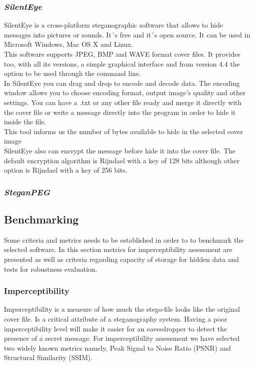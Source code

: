 \documentclass[11pt]{article}
\begin{document}
\subsubsection{\textit{SilentEye}}
SilentEye is a cross-platform steganographic software that allows to hide messages into pictures or sounds. It´s free and it´s open source. It can be used in Microsoft Windows, Mac OS X and Linux. \\
This software supports JPEG, BMP and WAVE format cover files. It provides too, with all its versions, a simple graphical interface and from version 4.4 the option to be used through the command line. \\
In SilentEye you can drag and drop to encode and decode data. The encoding window allows you to choose encoding format, output image’s quality and other settings. You can have a .txt or any other file ready and merge it directly with the cover file or write a message directly into the program in order to hide it inside the file.\\
This tool informs us the number of bytes available to hide in the selected cover image \\
SilentEye also can encrypt the message before hide it into the cover file. The default encryption algorithm is Rijndael with a key of 128 bits although other option is Rijndael with a key of 256 bits.

\subsubsection{\textit{SteganPEG}}

\subsection{Benchmarking}

Some criteria and metrics needs to be established in order to to benchmark the selected software.
In this section metrics for imperceptibility assessment are presented as well as criteria regarding capacity of storage for
hidden data and tests for robustness evaluation.

\subsubsection{Imperceptibility}

Imperceptibility is a measure of how much the stego-file
looks like the original cover file. Is a critical attribute of a steganography system. Having a poor imperceptibility level will make it 
easier for an eavesdropper to detect the presence of a secret message. For imperceptibility assessment we have selected
two widely known metrics namely, Peak Signal to Noise Ratio (PSNR) and Structural Similarity (SSIM).
\end{document}
